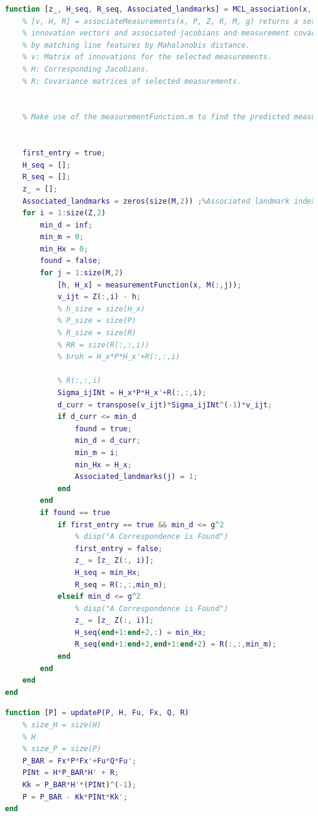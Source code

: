 \documentclass[answers]{exam}
\begin{document}
\begin{questions}
\begin{parts}
\begin{solution}
            \begin{lstlisting}[language=Matlab, caption=Associate Landmarks, label={lst:code6}]
function [z_, H_seq, R_seq, Associated_landmarks] = MCL_association(x, P, Z, R, M, g)
    % [v, H, R] = associateMeasurements(x, P, Z, R, M, g) returns a set of
    % innovation vectors and associated jacobians and measurement covariances
    % by matching line features by Mahalanobis distance.
    % v: Matrix of innovations for the selected measurements.
    % H: Corresponding Jacobians.
    % R: Covariance matrices of selected measurements.


    % Make use of the measurementFunction.m to find the predicted measurements.


    first_entry = true;
    H_seq = [];
    R_seq = [];
    z_ = [];
    Associated_landmarks = zeros(size(M,2)) ;%Associated landmark index
    for i = 1:size(Z,2)
        min_d = inf;
        min_m = 0;
        min_Hx = 0;
        found = false;
        for j = 1:size(M,2)
            [h, H_x] = measurementFunction(x, M(:,j));
            v_ijt = Z(:,i) - h;
            % h_size = size(H_x)
            % P_size = size(P)
            % R_size = size(R)
            % RR = size(R(:,:,i))
            % bruh = H_x*P*H_x'+R(:,:,i)
            
            % R(:,:,i)
            Sigma_ijINt = H_x*P*H_x'+R(:,:,i);
            d_curr = transpose(v_ijt)*Sigma_ijINt^(-1)*v_ijt;
            if d_curr <= min_d
                found = true;
                min_d = d_curr;
                min_m = i;
                min_Hx = H_x;
                Associated_landmarks(j) = 1;
            end
        end
        if found == true
            if first_entry == true && min_d <= g^2
                % disp("A Correspondence is Found")
                first_entry = false;
                z_ = [z_ Z(:, i)];
                H_seq = min_Hx;
                R_seq = R(:,:,min_m);
            elseif min_d <= g^2
                % disp("A Correspondence is Found")
                z_ = [z_ Z(:, i)];
                H_seq(end+1:end+2,:) = min_Hx;
                R_seq(end+1:end+2,end+1:end+2) = R(:,:,min_m);
            end
        end
    end
end
            \end{lstlisting}

            \begin{lstlisting}[language=Matlab, caption=Update Particles, label={lst:code7}]
function [P] = updateP(P, H, Fu, Fx, Q, R)
    % size_H = size(H)
    % H
    % size_P = size(P)
    P_BAR = Fx*P*Fx'+Fu*Q*Fu';
    PINt = H*P_BAR*H' + R;
    Kk = P_BAR*H'*(PINt)^(-1);
    P = P_BAR - Kk*PINt*Kk'; 
end
            \end{lstlisting}


\end{solution}
\end{parts}
\end{questions}
\end{document}
